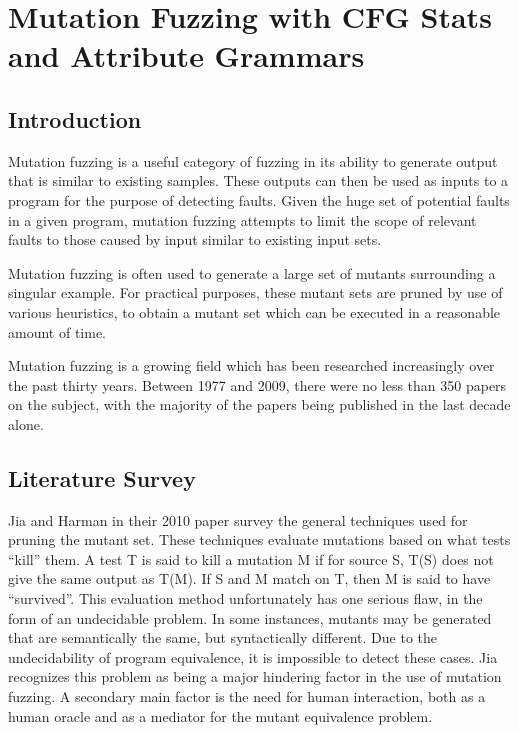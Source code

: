\section{Mutation Fuzzing with CFG Stats and Attribute Grammars}
\label{mutation}

\subsection{Introduction}
Mutation fuzzing is a useful category of fuzzing in its ability to
generate output that is similar to existing samples. These outputs can
then be used as inputs to a program for the purpose of detecting
faults. Given the huge set of potential faults in a given program,
mutation fuzzing attempts to limit the scope of relevant faults to
those caused by input similar to existing input sets.

Mutation fuzzing is often used to generate a large set of mutants
surrounding a singular example. For practical purposes, these mutant
sets are pruned by use of various heuristics, to obtain a mutant set
which can be executed in a reasonable amount of time.

Mutation fuzzing is a growing field which has been researched
increasingly over the past thirty years. Between 1977 and 2009, there
were no less than 350 papers on the subject, with the majority of the
papers being published in the last decade alone. \cite{Jia2010}

\subsection{Literature Survey}
Jia and Harman in their 2010 paper survey the general techniques used
for pruning the mutant set.\cite{Jia2010} These techniques evaluate
mutations based on what tests ``kill'' them. A test T is said to kill
a mutation M if for source S, T(S) does not give the same output as
T(M). If S and M match on T, then M is said to have ``survived''. This
evaluation method unfortunately has one serious flaw, in the form of
an undecidable problem. In some instances, mutants may be generated
that are semantically the same, but syntactically different. Due to
the undecidability of program equivalence, it is impossible to detect
these cases. Jia recognizes this problem as being a major hindering
factor in the use of mutation fuzzing. A secondary main factor is the
need for human interaction, both as a human oracle and as a mediator
for the mutant equivalence problem.

